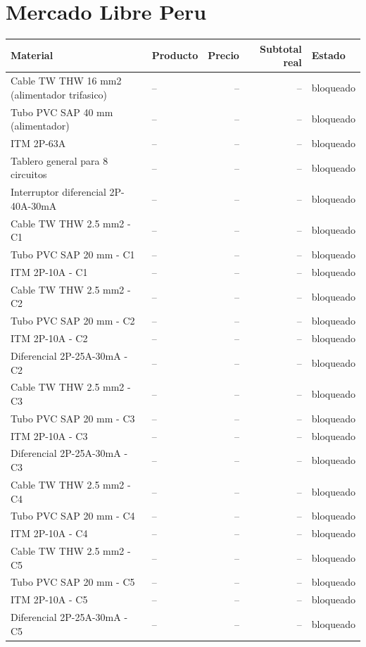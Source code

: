 \documentclass[11pt,a4paper]{article}
\begin{document}
\section{Mercado Libre Peru}
\begin{longtable}{p{} p{} r r p{}}
\toprule Material & Producto & Precio & Subtotal real & Estado \\ \midrule\endhead
Cable TW THW 16 mm2 (alimentador trifasico) & -- & -- & -- & bloqueado \\
Tubo PVC SAP 40 mm (alimentador) & -- & -- & -- & bloqueado \\
ITM 2P-63A & -- & -- & -- & bloqueado \\
Tablero general para 8 circuitos & -- & -- & -- & bloqueado \\
Interruptor diferencial 2P-40A-30mA & -- & -- & -- & bloqueado \\
Cable TW THW 2.5 mm2 - C1 & -- & -- & -- & bloqueado \\
Tubo PVC SAP 20 mm - C1 & -- & -- & -- & bloqueado \\
ITM 2P-10A - C1 & -- & -- & -- & bloqueado \\
Cable TW THW 2.5 mm2 - C2 & -- & -- & -- & bloqueado \\
Tubo PVC SAP 20 mm - C2 & -- & -- & -- & bloqueado \\
ITM 2P-10A - C2 & -- & -- & -- & bloqueado \\
Diferencial 2P-25A-30mA - C2 & -- & -- & -- & bloqueado \\
Cable TW THW 2.5 mm2 - C3 & -- & -- & -- & bloqueado \\
Tubo PVC SAP 20 mm - C3 & -- & -- & -- & bloqueado \\
ITM 2P-10A - C3 & -- & -- & -- & bloqueado \\
Diferencial 2P-25A-30mA - C3 & -- & -- & -- & bloqueado \\
Cable TW THW 2.5 mm2 - C4 & -- & -- & -- & bloqueado \\
Tubo PVC SAP 20 mm - C4 & -- & -- & -- & bloqueado \\
ITM 2P-10A - C4 & -- & -- & -- & bloqueado \\
Cable TW THW 2.5 mm2 - C5 & -- & -- & -- & bloqueado \\
Tubo PVC SAP 20 mm - C5 & -- & -- & -- & bloqueado \\
ITM 2P-10A - C5 & -- & -- & -- & bloqueado \\
Diferencial 2P-25A-30mA - C5 & -- & -- & -- & bloqueado \\

\end{longtable}
\end{document}
